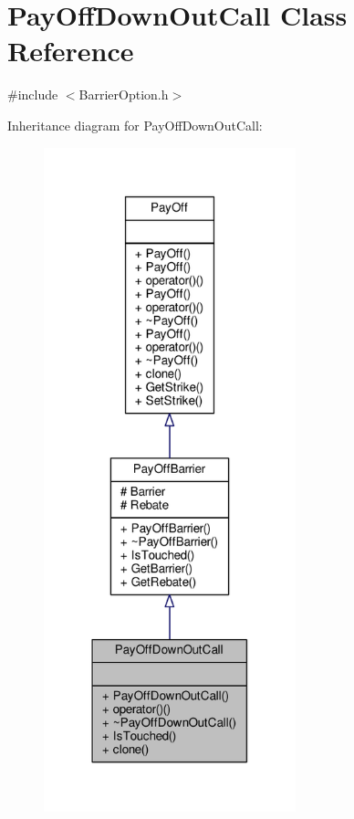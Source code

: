 \hypertarget{classPayOffDownOutCall}{}\section{Pay\+Off\+Down\+Out\+Call Class Reference}
\label{classPayOffDownOutCall}


{\ttfamily \#include $<$Barrier\+Option.\+h$>$}



Inheritance diagram for Pay\+Off\+Down\+Out\+Call\+:
\nopagebreak
\begin{figure}[H]
\begin{center}
\leavevmode
\includegraphics[width=207pt]{classPayOffDownOutCall__inherit__graph}
\end{center}
\end{figure}


